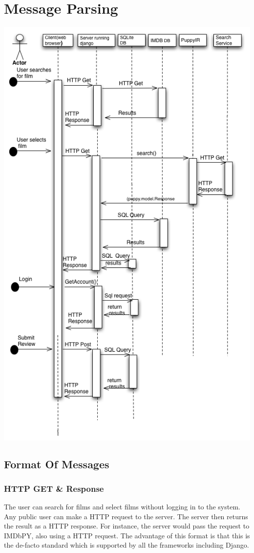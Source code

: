 \documentclass{sig-alt-release2}
\begin{document}
\section{Message Parsing}
\includegraphics[scale=0.4]{seqdiagram.png}

\subsection{Format Of Messages}

\subsubsection*{HTTP GET \& Response}
The user can search for films and select films without logging in to the system. Any public user can make a HTTP request to the server. The server then returns the result as a HTTP response. For instance, the server would pass the request to IMDbPY, also using a HTTP request. The advantage of this format is that this is the  de-facto standard which is supported by all the frameworks including Django. 
\end{document}
